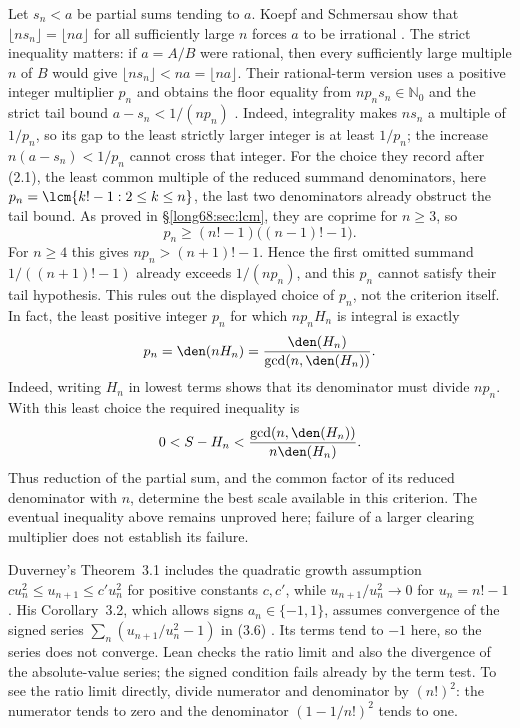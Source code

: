 Let $s_n<a$ be partial sums tending to $a$. Koepf and Schmersau show that
$\lfloor ns_n\rfloor=\lfloor na\rfloor$ for all sufficiently large $n$
forces $a$ to be irrational \cite[Thm.~1.1, p.~117]{koepf-schmersau}.
The strict inequality matters: if $a=A/B$ were rational, then every
sufficiently large multiple $n$ of $B$ would give
$\lfloor ns_n\rfloor<na=\lfloor na\rfloor$. Their rational-term version
uses a positive integer multiplier $p_n$ and obtains the floor equality
from $np_ns_n\in\mathbb N_0$ and the strict tail bound
$a-s_n<1/(np_n)$
\cite[(2.1) and (2.3), p.~118; Thms.~2.2--2.3, pp.~119--120]{koepf-schmersau}.
Indeed, integrality makes $ns_n$ a multiple of $1/p_n$, so its gap to the
least strictly larger integer is at least $1/p_n$; the increase
$n(a-s_n)<1/p_n$ cannot cross that integer.
For the choice they record after (2.1), the least common multiple of the
reduced summand denominators, here $p_n=\lcm\{k!-1:2\le k\le n\}$, the last
two denominators already obstruct the tail bound. As proved in
\S\ref{long68:sec:lcm}, they are coprime for $n\ge3$, so
\[
 p_n\ge(n!-1)\bigl((n-1)!-1\bigr).
\]
For $n\ge4$ this gives $np_n>(n+1)!-1$. Hence the first omitted summand
$1/((n+1)!-1)$ already exceeds $1/(np_n)$, and this $p_n$ cannot satisfy
their tail hypothesis. This rules out the displayed choice of $p_n$, not
the criterion itself. In fact, the least positive integer $p_n$ for which
$np_nH_n$ is integral is exactly
\[
 p_n=\den(nH_n)
     =\frac{\den(H_n)}{\gcd(n,\den(H_n))}.
\]
Indeed, writing $H_n$ in lowest terms shows that its denominator must
divide $np_n$. With this least choice the required inequality is
\[
 0<S-H_n<\frac{\gcd(n,\den(H_n))}{n\den(H_n)}.
\]
Thus reduction of the partial sum, and the common factor of its reduced
denominator with $n$, determine the best scale available in this
criterion. The eventual inequality above remains unproved here; failure
of a larger clearing multiplier does not establish its failure.

Duverney's Theorem~3.1 includes the quadratic growth assumption
$cu_n^2\le u_{n+1}\le c'u_n^2$ for positive constants $c,c'$, while
$u_{n+1}/u_n^2\to0$ for $u_n=n!-1$
\cite[(1.3), p.~275; Thm.~3.1, pp.~285--286]{duverney}.
His Corollary~3.2, which allows signs $a_n\in\{-1,1\}$, assumes convergence
of the signed series $\sum_n(u_{n+1}/u_n^2-1)$ in (3.6)
\cite[Cor.~3.2, p.~287]{duverney}. Its terms tend to $-1$ here, so the
series does not converge. Lean checks the ratio
limit and also the divergence of the absolute-value series; the signed
condition fails already by the term test. To see the ratio limit directly, divide
numerator and denominator by $(n!)^2$: the numerator tends to zero and
the denominator $(1-1/n!)^2$ tends to one.

